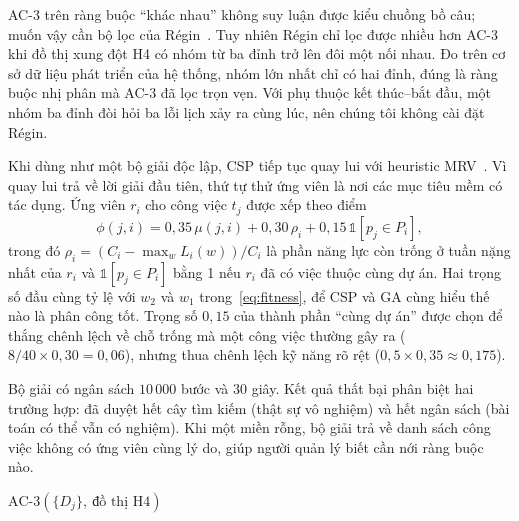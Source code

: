 \documentclass{IEEEtran}
\begin{document}
AC-3 trên ràng buộc ``khác nhau'' không suy luận được kiểu chuồng bồ câu; muốn vậy cần bộ lọc của Régin~\cite{regin1994}. Tuy nhiên Régin chỉ lọc được nhiều hơn AC-3 khi đồ thị xung đột H4 có nhóm từ ba đỉnh trở lên đôi một nối nhau. Đo trên cơ sở dữ liệu phát triển của hệ thống, nhóm lớn nhất chỉ có hai đỉnh, đúng là ràng buộc nhị phân mà AC-3 đã lọc trọn vẹn. Với phụ thuộc kết thúc--bắt đầu, một nhóm ba đỉnh đòi hỏi ba lỗi lịch xảy ra cùng lúc, nên chúng tôi không cài đặt Régin.

Khi dùng như một bộ giải độc lập, CSP tiếp tục quay lui với heuristic MRV~\cite{haralick1980}. Vì quay lui trả về lời giải đầu tiên, thứ tự thử ứng viên là nơi các mục tiêu mềm có tác dụng. Ứng viên $r_i$ cho công việc $t_j$ được xếp theo điểm
\begin{equation}
\phi(j,i)=0{,}35\,\mu(j,i)+0{,}30\,\rho_i+0{,}15\,\mathbb{1}[p_j\in P_i],
\label{eq:order}
\end{equation}
trong đó $\rho_i=(C_i-\max_w L_i(w))/C_i$ là phần năng lực còn trống ở tuần nặng nhất của $r_i$ và $\mathbb{1}[p_j\in P_i]$ bằng 1 nếu $r_i$ đã có việc thuộc cùng dự án.
Hai trọng số đầu cùng tỷ lệ với $w_2$ và $w_1$ trong~\eqref{eq:fitness}, để CSP và GA cùng hiểu thế nào là phân công tốt. Trọng số $0{,}15$ của thành phần ``cùng dự án'' được chọn để thắng chênh lệch về chỗ trống mà một công việc thường gây ra ($8/40\times0{,}30=0{,}06$), nhưng thua chênh lệch kỹ năng rõ rệt ($0{,}5\times0{,}35\approx0{,}175$).

Bộ giải có ngân sách $10\,000$ bước và $30$ giây. Kết quả thất bại phân biệt hai trường hợp: đã duyệt hết cây tìm kiếm (thật sự vô nghiệm) và hết ngân sách (bài toán có thể vẫn có nghiệm). Khi một miền rỗng, bộ giải trả về danh sách công việc không có ứng viên cùng lý do, giúp người quản lý biết cần nới ràng buộc nào.

\begin{algorithm}[t]
\caption{Pha thỏa mãn ràng buộc}
\label{alg:csp}
$\text{AC-3}(\{D_j\},\ \text{đồ thị H4})$\;
\;
\end{algorithm}
\end{document}
